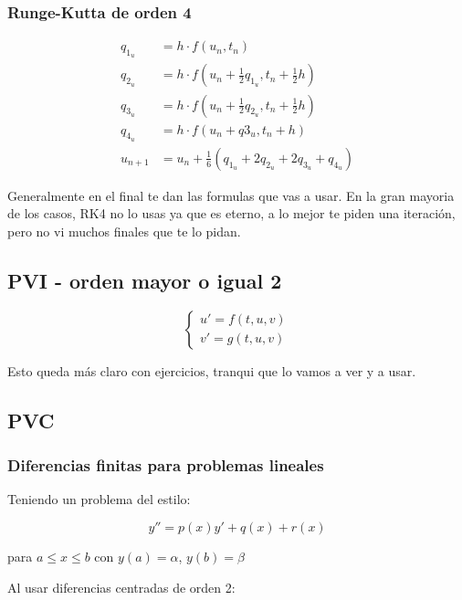 \subsubsection{Runge-Kutta de orden 4}
\begin{align*}
q_{1_u} &= h \cdot f(u_n, t_n) \\
q_{2_u} &= h \cdot f\left(u_n + \frac{1}{2} q_{1_u}, t_n + \frac{1}{2} h\right) \\
q_{3_u} &= h \cdot f\left(u_n + \frac{1}{2} q_{2_u}, t_n + \frac{1}{2} h\right) \\
q_{4_u} &= h \cdot f\left(u_n + q3_u, t_n + h\right) \\
u_{n+1} &= u_n + \frac{1}{6} \left(q_{1_u} + 2q_{2_u} + 2q_{3_u} + q_{4_u}\right)
\end{align*}



Generalmente en el final te dan las formulas que vas a usar. En la gran mayoria de los casos, RK4 no lo usas ya que es eterno, a lo mejor te piden una iteración, pero no vi muchos finales que te lo pidan.

\subsection{PVI - orden mayor o igual 2 }

\begin{equation}
\left\{
\begin{array}{l}
u' = f(t,u,v) \\
v' = g(t,u,v)
\end{array}
\right.
\end{equation}

Esto queda más claro con ejercicios, tranqui que lo vamos a ver y a usar. 

\subsection{PVC}
\subsubsection{Diferencias finitas para problemas lineales}

Teniendo un problema del estilo: 


$$y'' = p(x)y' + q(x) + r(x) $$

para $a \leq x \leq b$ con $y(a) = \alpha$, $y(b) = \beta$


Al usar diferencias centradas de orden 2:

